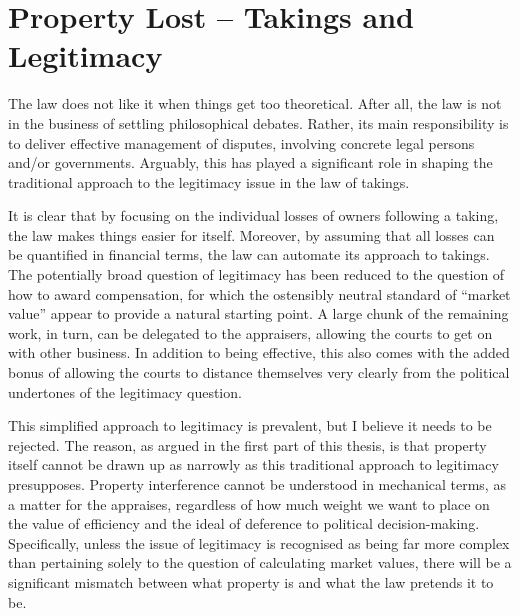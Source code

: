 
\section{Property Lost -- Takings and Legitimacy}

The law does not like it when things get too theoretical. After all, the law is not in the business of settling philosophical debates. Rather, its main responsibility is to deliver effective management of  disputes, involving concrete legal persons and/or governments. Arguably, this has played a significant role in shaping the traditional approach to the legitimacy issue in the law of takings.

It is clear that by focusing on the individual losses of owners following a taking, the law makes things easier for itself. Moreover, by assuming that all losses can be quantified in financial terms, the law can automate its approach to takings. The potentially broad question of legitimacy has been reduced to the question of how to award compensation, for which the ostensibly neutral standard of ``market value'' appear to provide a natural starting point. A large chunk of the remaining work, in turn, can be delegated to the appraisers, allowing the courts to get on with other business. In addition to being effective, this also comes with the added bonus of allowing the courts to distance themselves very clearly from the political undertones of the legitimacy question.

This simplified approach to legitimacy is prevalent, but I believe it needs to be rejected. The reason, as argued in the first part of this thesis, is that property itself cannot be drawn up as narrowly as this traditional approach to legitimacy presupposes. Property interference cannot be understood in mechanical terms, as a matter for the appraises, regardless of how much weight we want to place on the value of efficiency and the ideal of deference to political decision-making. Specifically, unless the issue of legitimacy is recognised as being far more complex than pertaining solely to the question of calculating market values, there will be a significant mismatch between what property is and what the law pretends it to be.

